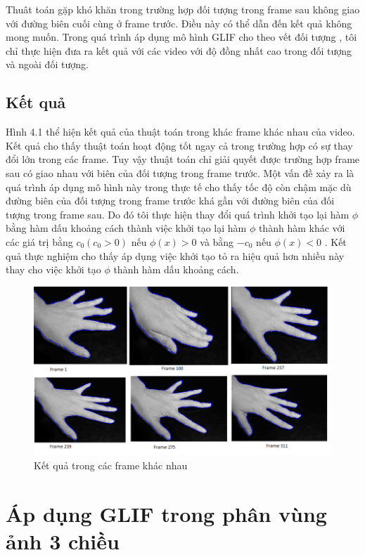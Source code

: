 \documentclass[12pt,oneside,a4]{report}
\begin{document}
Thuât toán gặp khó khăn trong trường hợp đối tượng trong frame sau không giao với đường biên cuối cùng ở frame trước. Điều này có thể dẫn đến kết quả không mong muốn. Trong quá trình áp dụng mô hình GLIF cho theo vết đối tượng  , tôi chỉ thực hiện đưa ra kết quả với các video với độ đồng nhất cao trong đối tượng và ngoài đối tượng.  
\section{Kết quả}
Hình 4.1 thể hiện kết quả của thuật toán trong khác frame khác nhau của video. Kết quả cho thấy thuật toán hoạt động tốt ngay cả trong trường hợp có sự thay đổi lớn trong các frame. Tuy vậy thuật toán chỉ giải quyết được trường hợp frame sau có giao nhau với biên của đối tượng trong frame trước. Một vấn đề xảy ra là quá trình áp dụng  mô hình này  trong thực tế cho thấy tốc độ còn chậm mặc dù đường biên của đối tượng trong frame trước khá gần với đường biên của đối tượng trong frame sau. Do đó tôi thực hiện thay đổi quá trình khởi tạo lại hàm $\phi$ bằng hàm dấu khoảng cách thành việc khởi tạo lại hàm $\phi$ thành hàm khác với các giá trị bằng $c_0(c_0>0)$ nếu $\phi(x)>0$ và bằng $-c_0$ nếu $\phi(x)<0$ . Kết quả thực nghiệm cho thấy áp dụng việc khởi tạo  tỏ ra hiệu quả hơn nhiều này thay cho việc khởi tạo $\phi$ thành  hàm dấu khoảng cách.
\begin{center}
\begin{figure}
\caption{Kết quả trong các frame khác nhau}
\includegraphics[scale=0.6]{figure/video.png}
\end{figure}

\end{center}   
\chapter{Áp dụng GLIF trong phân vùng ảnh 3 chiều}
\end{document}
